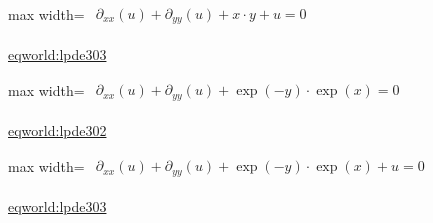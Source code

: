 \documentclass[UTF8,10pt,a4paper,fontset=mac]{ctexart}
\begin{document}
\begin{minipage}{\linewidth}\begin{center}\begin{adjustbox}{max width=\linewidth}$\displaystyle\begin{gathered}\begin{gathered}\partial_{xx}(u)+\partial_{yy}(u)+x\cdot y+u=0\end{gathered}\end{gathered}$\end{adjustbox}\end{center}{\small\href{https://eqworld.ipmnet.ru/en/solutions/lpde/lpde303.pdf}{eqworld:lpde303}}\par\end{minipage}\par\vspace{6mm}

\begin{minipage}{\linewidth}\begin{center}\begin{adjustbox}{max width=\linewidth}$\displaystyle\begin{gathered}\begin{gathered}\partial_{xx}(u)+\partial_{yy}(u)+\exp(-y)\cdot \exp(x)=0\end{gathered}\end{gathered}$\end{adjustbox}\end{center}{\small\href{https://eqworld.ipmnet.ru/en/solutions/lpde/lpde302.pdf}{eqworld:lpde302}}\par\end{minipage}\par\vspace{6mm}

\begin{minipage}{\linewidth}\begin{center}\begin{adjustbox}{max width=\linewidth}$\displaystyle\begin{gathered}\begin{gathered}\partial_{xx}(u)+\partial_{yy}(u)+\exp(-y)\cdot \exp(x)+u=0\end{gathered}\end{gathered}$\end{adjustbox}\end{center}{\small\href{https://eqworld.ipmnet.ru/en/solutions/lpde/lpde303.pdf}{eqworld:lpde303}}\par\end{minipage}\par\vspace{6mm}
\end{document}
